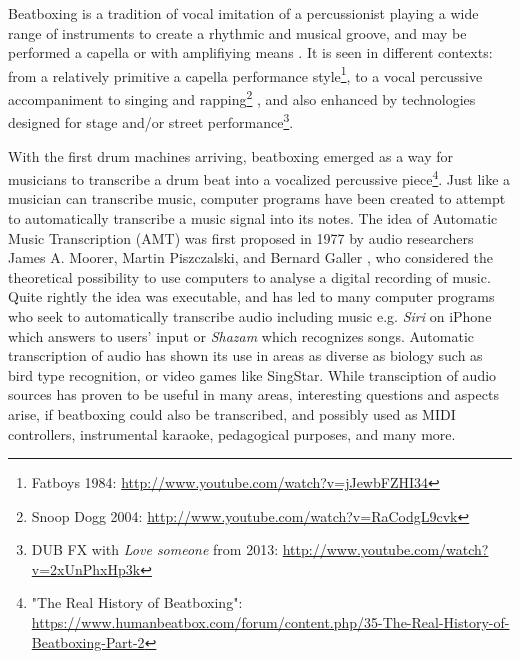 Beatboxing is a tradition of vocal imitation of a percussionist playing a wide range of instruments to create a rhythmic and musical groove, and may be performed a capella or with amplifiying means \citep{Stowell2008}.
It is seen in different contexts: from a relatively primitive a capella performance style\footnote{Fatboys 1984: \url{http://www.youtube.com/watch?v=jJewbFZHI34}}, to a vocal percussive accompaniment to singing and rapping\footnote{Snoop Dogg 2004: \url{http://www.youtube.com/watch?v=RaCodgL9cvk}} , and also enhanced by technologies designed for stage and/or street performance\footnote{DUB FX with \textit{Love someone} from 2013: \url{http://www.youtube.com/watch?v=2xUnPhxHp3k}}.

With the first drum machines arriving, beatboxing emerged as a way for musicians to transcribe a drum beat into a vocalized percussive piece\footnote{"The Real History of Beatboxing": \url{https://www.humanbeatbox.com/forum/content.php/35-The-Real-History-of-Beatboxing-Part-2}}. Just like a musician can transcribe music, computer programs have been created to attempt to automatically transcribe a music signal into its notes. The idea of Automatic Music Transcription (AMT) was first proposed in 1977 by audio researchers James A. Moorer, Martin Piszczalski, and Bernard Galler \citep{Scheirer1998}, who considered the theoretical possibility to use computers to analyse a digital recording of music. Quite rightly the idea was executable, and has led to many computer programs who seek to automatically transcribe audio including music e.g. \textit{ Siri } on iPhone which answers to users' input or \textit{ Shazam } which recognizes songs. 
Automatic transcription of audio has shown its use in areas as diverse as biology such as bird type recognition, or video games like SingStar.
While transciption of audio sources has proven to be useful in many areas, interesting questions and aspects arise, if beatboxing could also be transcribed, and possibly used as MIDI controllers, instrumental karaoke, pedagogical purposes, and many more.

